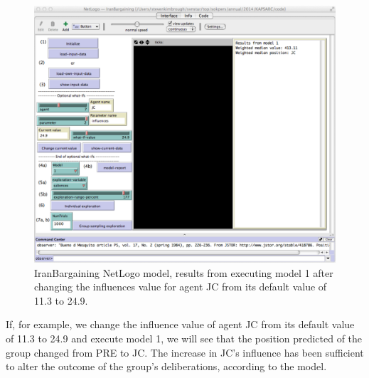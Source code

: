 \begin{figure}[htbp] %
   \centering
   \includegraphics[width=\textwidth]{chapters/gdp/figures/JCinfluence249.pdf} 
   \caption{IranBargaining NetLogo model, results from executing model 1 after changing the influences value for agent JC from its default value of 11.3 to 24.9.}
   \label{fig:IranBargainingModel1JC249}
\end{figure}





If, for example, we change the influence  value of agent JC from its default value of 11.3 to 24.9 and execute model 1, we will see that the position predicted of the group changed from PRE to JC. The increase in JC's influence has been sufficient to alter the outcome of the group's deliberations, according to the model.

%

